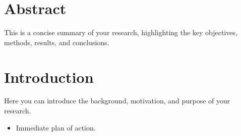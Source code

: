 \documentclass{article}
\begin{document}
\newpage
\tableofcontents %
\newpage

\section*{Abstract}

This is a concise summary of your research, highlighting the key objectives, methods, results, and conclusions. 

\section{Introduction}
Here you can introduce the background, motivation, and purpose of your research.

\begin{itemize}
  \item Immediate plan of action.
\end{itemize}

\end{document}
